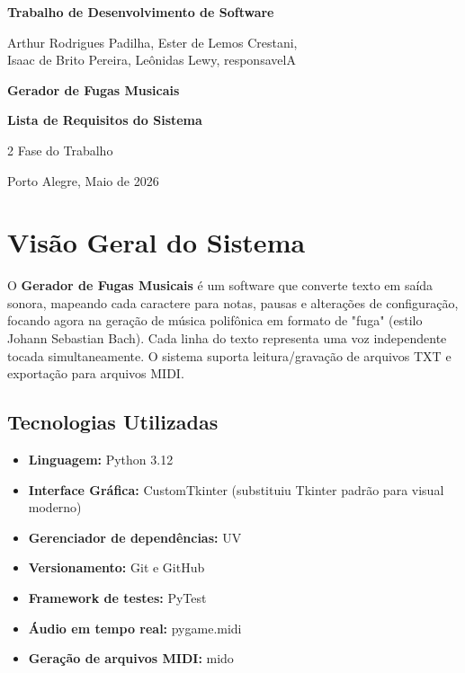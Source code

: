 \documentclass[12pt, a4paper]{article}
\begin{document}
\begin{titlepage}
  \centering
  \vspace*{2cm}
  {\Large\bfseries\color{azulescuro} Trabalho de Desenvolvimento de Software\par}
  \vspace{0.5cm}
  {\large\color{cinza} Arthur Rodrigues Padilha, Ester de Lemos Crestani,\\ Isaac de Brito Pereira, Leônidas Lewy, responsavelA\par}
  \vspace{2cm}
  {\Huge\bfseries\color{azulprincipal} Gerador de Fugas Musicais\par}
  \vspace{1cm}
  {\large\bfseries Lista de Requisitos do Sistema\par}
  \vspace{0.5cm}
  {\normalsize 2\textordfeminine{} Fase do Trabalho\par}
  \vfill
  {\normalsize Porto Alegre, Maio de 2026}
\end{titlepage}

\tableofcontents
\newpage

\section{Visão Geral do Sistema}

O \textbf{Gerador de Fugas Musicais} é um software que converte texto em saída sonora, mapeando cada caractere para notas, pausas e alterações de configuração, focando agora na geração de música polifônica em formato de "fuga" (estilo Johann Sebastian Bach). Cada linha do texto representa uma voz independente tocada simultaneamente. O sistema suporta leitura/gravação de arquivos TXT e exportação para arquivos MIDI.

\subsection{Tecnologias Utilizadas}

\begin{itemize}[leftmargin=2cm]
  \item \textbf{Linguagem:} Python 3.12
  \item \textbf{Interface Gráfica:} CustomTkinter (substituiu Tkinter padrão para visual moderno)
  \item \textbf{Gerenciador de dependências:} UV
  \item \textbf{Versionamento:} Git e GitHub
  \item \textbf{Framework de testes:} PyTest
  \item \textbf{Áudio em tempo real:} pygame.midi
  \item \textbf{Geração de arquivos MIDI:} mido
\end{itemize}
\end{document}
